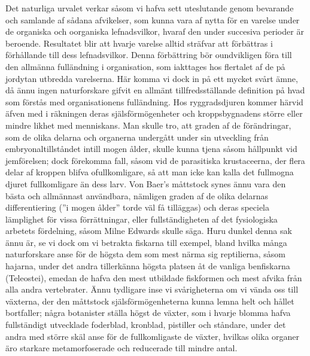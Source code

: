 Det naturliga urvalet verkar såsom vi hafva sett uteslutande genom bevarande och samlande af sådana afvikelser, som kunna vara af nytta för en varelse under de organiska och oorganiska lefnadsvilkor, hvaraf den under succesiva perioder är beroende. Resultatet blir att hvarje varelse alltid sträfvar att förbättras i förhållande till dess lefnadsvilkor. Denna förbättring bör oundvikligen föra till den allmänna fulländning i organisation, som iakttages hos flertalet af de på jordytan utbredda varelserna. Här komma vi dock in på ett mycket svårt ämne, då ännu ingen naturforskare gifvit en allmänt tillfredsställande definition på hvad som förstås med organisationens fulländning. Hos ryggradsdjuren kommer härvid äfven med i räkningen deras själsförmögenheter och kroppsbygnadens större eller mindre likhet med menniskans. Man skulle tro, att graden af de förändringar, som de olika delarna och organerna undergått under sin utveckling från embryonaltillståndet intill mogen ålder, skulle kunna tjena såsom hållpunkt vid jemförelsen; dock förekomma fall, såsom vid de parasitiska krustaceerna, der flera delar af kroppen blifva ofullkomligare, så att man icke kan kalla det fullmogna djuret fullkomligare än dess larv. Von Baer’s måttstock synes ännu vara den bästa och allmännast användbara, nämligen graden af de olika delarnas differentiering (”i mogen ålder” torde väl få tilläggas) och deras speciela lämplighet för vissa förrättningar, eller fullständigheten af det fysiologiska arbetets fördelning, såsom Milne Edwards skulle säga. Huru dunkel denna sak ännu är, se vi dock om vi betrakta fiskarna till exempel, bland hvilka många naturforskare anse för de högsta dem som mest närma sig reptilierna, såsom hajarna, under det andra tillerkänna högsta platsen åt de vanliga benfiskarna (Teleostei), emedan de hafva den mest utbildade fiskformen och mest afvika från alla andra vertebrater. Ännu tydligare inse vi svårigheterna om vi vända oss till växterna, der den måttstock själsförmögenheterna kunna lemna helt och hållet bortfaller; några botanister ställa högst de växter, som i hvarje blomma hafva fullständigt utvecklade foderblad, kronblad, pistiller och ståndare, under det andra med större skäl anse för de fullkomligaste de växter, hvilkas olika organer äro starkare metamorfoserade och reducerade till mindre antal.

